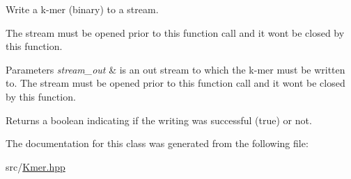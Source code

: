 Write a k-\/mer (binary) to a stream. 

The stream must be opened prior to this function call and it won\textquotesingle{}t be closed by this function. 
\begin{DoxyParams}{Parameters}
{\em stream\+\_\+out} & is an out stream to which the k-\/mer must be written to. The stream must be opened prior to this function call and it won\textquotesingle{}t be closed by this function. \\
\hline
\end{DoxyParams}
\begin{DoxyReturn}{Returns}
a boolean indicating if the writing was successful (true) or not. 
\end{DoxyReturn}


The documentation for this class was generated from the following file\+:\begin{DoxyCompactItemize}
\item 
src/\hyperlink{Kmer_8hpp}{Kmer.\+hpp}\end{DoxyCompactItemize}
